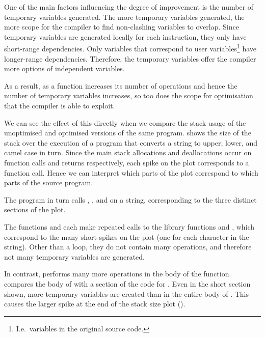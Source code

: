 \documentclass[00-main.tex]{subfiles}
\begin{document}
One of the main factors influencing the degree of improvement is the number of temporary variables generated.
The more temporary variables generated, the more scope for the compiler to find non-clashing variables to overlap.
Since temporary variables are generated locally for each instruction, they only have short-range dependencies.
Only variables that correspond to user variables\footnote{I.e.~variables in the original source code.} have longer-range dependencies.
Therefore, the temporary variables offer the compiler more options of independent variables.

As a result, as a function increases its number of operations and hence the number of temporary variables increases, so too does the scope for optimisation that the compiler is able to exploit.

We can see the effect of this directly when we compare the stack usage of the unoptimised and optimised versions of the same program.
 shows the size of the stack over the execution of a program that converts a string to upper, lower, and camel case in turn.
Since the main stack allocations and deallocations occur on function calls and returns respectively, each spike on the plot corresponds to a function call.
Hence we can interpret which parts of the plot correspond to which parts of the source program.

The program in turn calls , , and  on a string, corresponding to the three distinct sections of the plot.

The functions  and  each make repeated calls to the library functions  and , which correspond to the many short spikes on the plot (one for each character in the string).
Other than a  loop, they do not contain many operations, and therefore not many temporary variables are generated.

In contrast,  performs many more operations in the body of the function.
 compares the body of  with a section of the code for .
Even in the short section shown, more temporary variables are created than in the entire body of .
This causes the larger spike at the end of the stack size plot ().

\end{document}

